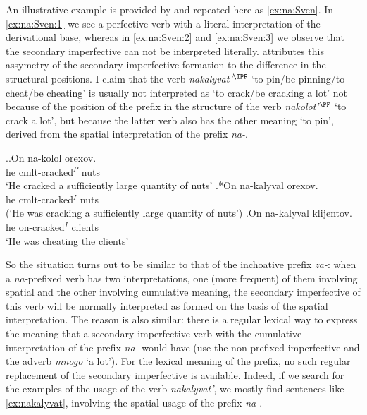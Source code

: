 An illustrative example is provided by \citet[233]{Svenonius:04b} and repeated here as \ref{ex:na:Sven}. In \ref{ex:na:Sven:1} we see a perfective verb with a literal interpretation of the derivational base, whereas in \ref{ex:na:Sven:2} and \ref{ex:na:Sven:3} we observe that the secondary imperfective can not be interpreted literally. \citet[233]{Svenonius:04b} attributes this assymetry of the secondary imperfective formation to the difference in the structural positions. I claim that the verb \textit{nakalyvat'}$^{\IPF}$ `to pin/be pinning/to cheat/be cheating' is usually not interpreted as `to crack/be cracking a lot' not because of the position of the prefix in the structure of the verb \textit{nakolot'}$^{\PF}$ `to crack a lot', but because the latter verb also has the other meaning `to pin', derived from the spatial interpretation of the prefix \textit{na-}. 

\ex.\label{ex:na:Sven}\ag.\label{ex:na:Sven:1}On na-kolol orexov.\\
he cmlt-cracked$^P$ nuts\\
\trans `He cracked a sufficiently large quantity of nuts'
\bg.\label{ex:na:Sven:2}*On na-kalyval orexov.\\
he cmlt-cracked$^I$ nuts\\
\vspace{0.5em}
(`He was cracking a sufficiently large quantity of nuts')
\bg.\label{ex:na:Sven:3}On na-kalyval klijentov.\\
he on-cracked$^I$ clients\\
\trans `He was cheating the clients'\\

So the situation turns out to be similar to that of the inchoative prefix \textit{za-}: when a \textit{na-}prefixed verb has two interpretations, one (more frequent) of them involving spatial and the other involving cumulative meaning, the secondary imperfective of this verb will be normally interpreted as formed on the basis of the spatial interpretation. The reason is also similar: there is a regular lexical way to express the meaning that a secondary imperfective verb with the cumulative interpretation of the prefix \textit{na-} would have (use the non-prefixed imperfective and the adverb \textit{mnogo} `a lot'). For the lexical meaning of the prefix, no such regular replacement of the secondary imperfective is available. Indeed, if we search for the examples of the usage of the verb \textit{nakalyvat'}, we mostly find sentences like \ref{ex:nakalyvat}, involving the spatial usage of the prefix \textit{na-}. 

